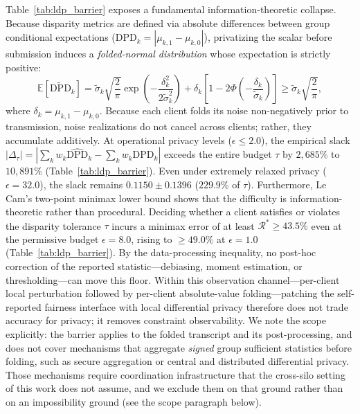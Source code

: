 Table~\ref{tab:ldp_barrier} exposes a fundamental information-theoretic collapse. Because disparity metrics are defined via absolute differences between group conditional expectations ($\text{DPD}_k = |\mu_{k,1} - \mu_{k,0}|$), privatizing the scalar before submission induces a \textit{folded-normal distribution} whose expectation is strictly positive:
\begin{equation}
    \mathbb{E}[\widetilde{\text{DPD}}_k] = \tilde{\sigma}_k \sqrt{\frac{2}{\pi}} \exp\left(-\frac{\delta_k^2}{2\tilde{\sigma}_k^2}\right) + \delta_k \left[1 - 2\Phi\left(-\frac{\delta_k}{\tilde{\sigma}_k}\right)\right] \ge \tilde{\sigma}_k \sqrt{\frac{2}{\pi}},
\end{equation}
where $\delta_k = \mu_{k,1} - \mu_{k,0}$. Because each client folds its noise non-negatively prior to transmission, noise realizations do not cancel across clients; rather, they accumulate additively. At operational privacy levels ($\epsilon \le 2.0$), the empirical slack $|\Delta_\tau| = |\sum_k w_k \widehat{\text{DPD}}_k - \sum_k w_k \text{DPD}_k|$ exceeds the entire budget $\tau$ by $2{,}685\%$ to $10{,}891\%$ (Table~\ref{tab:ldp_barrier}). Even under extremely relaxed privacy ($\epsilon = 32.0$), the slack remains $0.1150 \pm 0.1396$ ($229.9\%$ of $\tau$). Furthermore, Le Cam's two-point minimax lower bound shows that the difficulty is information-theoretic rather than procedural. Deciding whether a client satisfies or violates the disparity tolerance $\tau$ incurs a minimax error of at least $\mathcal{R}^* \ge 43.5\%$ even at the permissive budget $\epsilon = 8.0$, rising to $\ge 49.0\%$ at $\epsilon = 1.0$ (Table~\ref{tab:ldp_barrier}). By the data-processing inequality, no post-hoc correction of the reported statistic---debiasing, moment estimation, or thresholding---can move this floor. Within this observation channel---per-client local perturbation followed by per-client absolute-value folding---patching the self-reported fairness interface with local differential privacy therefore does not trade accuracy for privacy; it removes constraint observability. We note the scope explicitly: the barrier applies to the folded transcript and its post-processing, and does not cover mechanisms that aggregate \emph{signed} group sufficient statistics before folding, such as secure aggregation or central and distributed differential privacy. Those mechanisms require coordination infrastructure that the cross-silo setting of this work does not assume, and we exclude them on that ground rather than on an impossibility ground (see the scope paragraph below).

